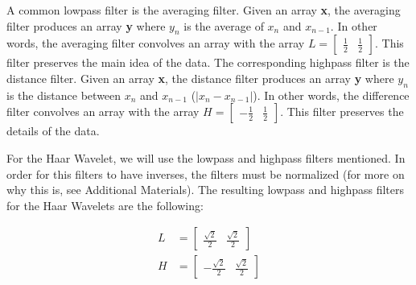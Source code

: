 A common lowpass filter is the averaging filter.
Given an array \textbf{x}, the averaging filter produces an array \textbf{y} where $y_n$ is the average of $x_n$ and $x_{n-1}$.
In other words, the averaging filter convolves an array with the array $L=\begin{bmatrix}\frac{1}{2} & \frac{1}{2}\end{bmatrix}$.
This filter preserves the main idea of the data.
The corresponding highpass filter is the distance filter.
Given an array \textbf{x}, the distance filter produces an array \textbf{y} where $y_n$ is the distance between $x_n$ and $x_{n-1}$ ($|x_n - x_{n-1}|$).
In other words, the difference filter convolves an array with the array $H=\begin{bmatrix}-\frac{1}{2}&\frac{1}{2}\end{bmatrix}$.
This filter preserves the details of the data.

For the Haar Wavelet, we will use the lowpass and highpass filters mentioned.
In order for this filters to have inverses, the filters must be normalized (for more on why this is, see Additional Materials).
The resulting lowpass and highpass filters for the Haar Wavelets are the following:
\begin{comment}
\begin{align*}
H &= \sqrt{2}\begin{bmatrix}\frac{1}{2} & \frac{1}{2}\\-\frac{1}{2} & \frac{1}{2}\end{bmatrix}\\
\end{align*}

For the Haar Wavelet, the matrix $H$ represents the Haar transform.
Each row of the transform represents an array which, when convolved with a vector, produces certain approximation and detail coefficients.
The first row of the Haar transform corresponds to the low-pass filter for the Haar wavelet, and the second row corresponds to the high-pass filter.
To fulfill all necessary properties when dealing with wavelets, the columns are orthonormal.
For more on the Haar Wavelet Transform, see Additional Materials.
\end{comment}
\begin{align*}
L &= \begin{bmatrix}\frac{\sqrt{2}}{2} & \frac{\sqrt{2}}{2}\end{bmatrix}\\H &=\begin{bmatrix}-\frac{\sqrt{2}}{2} & \frac{\sqrt{2}}{2}\end{bmatrix}\\
\end{align*}

